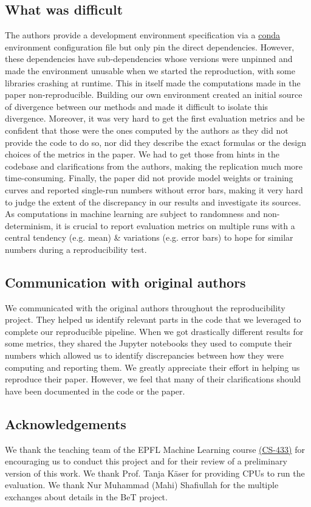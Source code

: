 \subsection{What was difficult}
The authors provide a development environment specification via a \href{https://docs.conda.io/en/latest/}{conda} environment configuration file but only pin the direct dependencies.
However, these dependencies have sub-dependencies whose versions were unpinned and made the environment unusable when we started the reproduction, with some libraries crashing at runtime.
This in itself made the computations made in the paper non-reproducible.
Building our own environment created an initial source of divergence between our methods and made it difficult to isolate this divergence.
Moreover, it was very hard to get the first evaluation metrics and be confident that those were the ones computed by the authors as they did not provide the code to do so, nor did they describe the exact formulas or the design choices of the metrics in the paper.
We had to get those from hints in the codebase and clarifications from the authors, making the replication much more time-consuming.
Finally, the paper did not provide model weights or training curves and reported single-run numbers without error bars, making it very hard to judge the extent of the discrepancy in our results and investigate its sources.
As computations in machine learning are subject to randomness and non-determinism, it is crucial to report evaluation metrics on multiple runs with a central tendency (e.g. mean) \& variations (e.g. error bars) \cite{pineau2020machine} to hope for similar numbers during a reproducibility test.

\subsection{Communication with original authors}
We communicated with the original authors throughout the reproducibility project.
They helped us identify relevant parts in the code that we leveraged to complete our reproducible pipeline.
When we got drastically different results for some metrics, they shared the Jupyter notebooks they used to compute their numbers which allowed us to identify discrepancies between how they were computing and reporting them.
We greatly appreciate their effort in helping us reproduce their paper.
However, we feel that many of their clarifications should have been documented in the code or the paper.


\subsection{Acknowledgements}
We thank the teaching team of the EPFL Machine Learning course \href{https://www.epfl.ch/labs/mlo/machine-learning-cs-433/}{(CS-433)} for encouraging us to conduct this project and for their review of a preliminary version of this work.
We thank Prof. Tanja Käser for providing CPUs to run the evaluation.
We thank Nur Muhammad (Mahi) Shafiullah for the multiple exchanges about details in the BeT project.
